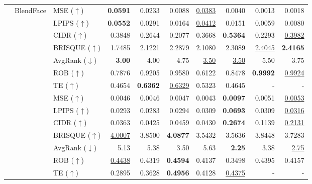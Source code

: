 \documentclass{article}
\begin{document}
\begin{table}[t!]
\begin{tabular}{lllrrrrrrr}
& \multirow{9}{*}{BlendFace}
& MSE ($\uparrow$) & \textbf{0.0591} & 0.0233 & 0.0088 & \underline{0.0383} & 0.0040 & 0.0013 & 0.0018 \\
& & LPIPS ($\uparrow$) & \textbf{0.0552} & 0.0291 & 0.0164 & \underline{0.0412} & 0.0151 & 0.0059 & 0.0080 \\
& & CIDR ($\uparrow$) & 0.3848 & 0.2644 & 0.2077 & 0.3668 & \textbf{0.5364} & 0.2293 & \underline{0.3982} \\
& & BRISQUE ($\uparrow$) & 1.7485 & 2.1221 & 2.2879 & 2.1080 & 2.3089 & \underline{2.4045} & \textbf{2.4165} \\
\cmidrule(lr){3-10}
& & AvgRank ($\downarrow$) & \textbf{3.00} & 4.00 & 4.75 & \underline{3.50} & \underline{3.50} & 5.50 & 3.75 \\
\cmidrule(lr){3-10}
& & ROB ($\uparrow$) & 0.7876 & 0.9205 & 0.9580 & 0.6122 & 0.8478 & \textbf{0.9992} & \underline{0.9924} \\
& & TE ($\uparrow$) & 0.4654 & \textbf{0.6362} & \underline{0.6329} & 0.5323 & 0.4645 & - & - \\

\cmidrule(lr){2-10}

& \multirow{9}{*}{DiffSwap}
& MSE ($\uparrow$) & 0.0046 & 0.0046 & 0.0047 & 0.0043 & \textbf{0.0097} & 0.0051 & \underline{0.0053} \\
& & LPIPS ($\uparrow$) & 0.0293 & 0.0283 & 0.0294 & 0.0309 & \textbf{0.0693} & 0.0309 & \underline{0.0316} \\
& & CIDR ($\uparrow$) & 0.0363 & 0.0425 & 0.0459 & 0.0430 & \textbf{0.2674} & 0.1139 & \underline{0.2131} \\
& & BRISQUE ($\uparrow$) & \underline{4.0007} & 3.8500 & \textbf{4.0877} & 3.5432 & 3.5636 & 3.8448 & 3.7283 \\
\cmidrule(lr){3-10}
& & AvgRank ($\downarrow$) & 5.13 & 5.38 & 3.50 & 5.63 & \textbf{2.25} & 3.38 & \underline{2.75} \\
\cmidrule(lr){3-10}
& & ROB ($\uparrow$) & \underline{0.4438} & 0.4319 & \textbf{0.4594} & 0.4137 & 0.3498 & 0.4395 & 0.4157 \\
& & TE ($\uparrow$) & 0.2895 & 0.3628 & \textbf{0.4956} & 0.4128 & \underline{0.4375} & - & - \\

\cmidrule(lr){2-10}


\end{tabular}
\end{table}
\end{document}
